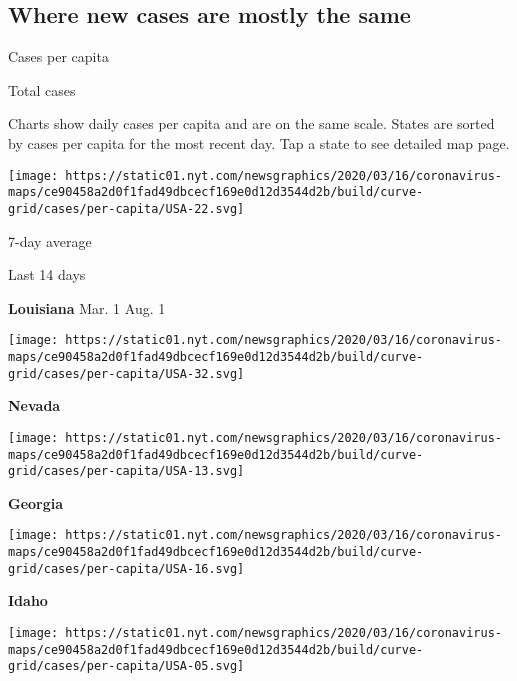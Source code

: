 \hypertarget{where-new-cases-are-mostly-the-same}{%
\subsection{Where new cases are mostly the
same}\label{where-new-cases-are-mostly-the-same}}

Cases per capita

Total cases

Charts show daily cases per capita and are on the same scale. States are
sorted by cases per capita for the most recent day. Tap a state to see
detailed map page.

\href{https://www.nytimes.com/interactive/2020/us/louisiana-coronavirus-cases.html}{}

\texttt{[image: https://static01.nyt.com/newsgraphics/2020/03/16/coronavirus-maps/ce90458a2d0f1fad49dbcecf169e0d12d3544d2b/build/curve-grid/cases/per-capita/USA-22.svg]}

7-day average

Last 14 days

\textbf{Louisiana} Mar. 1 Aug. 1

\href{https://www.nytimes.com/interactive/2020/us/nevada-coronavirus-cases.html}{}

\texttt{[image: https://static01.nyt.com/newsgraphics/2020/03/16/coronavirus-maps/ce90458a2d0f1fad49dbcecf169e0d12d3544d2b/build/curve-grid/cases/per-capita/USA-32.svg]}

\textbf{Nevada}

\href{https://www.nytimes.com/interactive/2020/us/georgia-coronavirus-cases.html}{}

\texttt{[image: https://static01.nyt.com/newsgraphics/2020/03/16/coronavirus-maps/ce90458a2d0f1fad49dbcecf169e0d12d3544d2b/build/curve-grid/cases/per-capita/USA-13.svg]}

\textbf{Georgia}

\href{https://www.nytimes.com/interactive/2020/us/idaho-coronavirus-cases.html}{}

\texttt{[image: https://static01.nyt.com/newsgraphics/2020/03/16/coronavirus-maps/ce90458a2d0f1fad49dbcecf169e0d12d3544d2b/build/curve-grid/cases/per-capita/USA-16.svg]}

\textbf{Idaho}

\href{https://www.nytimes.com/interactive/2020/us/arkansas-coronavirus-cases.html}{}

\texttt{[image: https://static01.nyt.com/newsgraphics/2020/03/16/coronavirus-maps/ce90458a2d0f1fad49dbcecf169e0d12d3544d2b/build/curve-grid/cases/per-capita/USA-05.svg]}

